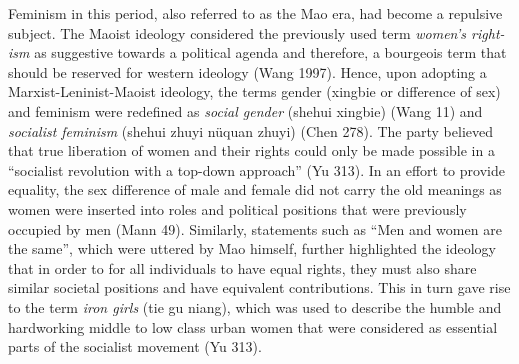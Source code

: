 \documentclass[12pt]{article}
\begin{document}
\begin{flushleft}
		Feminism in this period, also referred to as the Mao era, had become a repulsive subject. The Maoist ideology considered the previously used term \textit{women’s right-ism} as suggestive towards a political agenda and therefore, a bourgeois term that should be reserved for western ideology (Wang 1997). Hence, upon adopting a Marxist-Leninist-Maoist ideology, the terms gender (xingbie or difference of sex) and feminism were redefined as \textit{social gender} (shehui xingbie) (Wang 11) and \textit{socialist feminism} (shehui zhuyi nüquan zhuyi) (Chen 278). The party believed that true liberation of women and their rights could only be made possible in a “socialist revolution with a top-down approach” (Yu 313). In an effort to provide equality, the sex difference of male and female did not carry the old meanings as women were inserted into roles and political positions that were previously occupied by men (Mann 49). Similarly, statements such as “Men and women are the same”, which were uttered by Mao himself, further highlighted the ideology that in order to for all individuals to have equal rights, they must also share similar societal positions and have equivalent contributions. This in turn gave rise to the term \textit{iron girls} (tie gu niang), which was used to describe the humble and hardworking middle to low class urban women that were considered as essential parts of the socialist movement (Yu 313). 
		

\end{flushleft}
\end{document}
